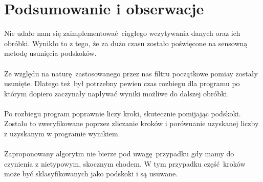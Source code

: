 \documentclass[a4paper, 12pt, titlepage]{article}
\begin{document}
    \section{Podsumowanie i obserwacje}
        Nie udało nam się zaimplementować ciągłego wczytywania danych
        oraz ich obróbki. Wynikło to z tego, że za dużo czasu zostało
        poświęcone na sensowną metodę usunięcia podskoków.
        \\ \\
        Ze względu na naturę zastosowanego przez nas filtru początkowe
        pomiay zostały usunięte. Dlatego też był potrzebny pewien
        czas rozbiegu dla programu po którym dopiero zaczynały napływać
        wyniki możliwe do dalszej obróbki.
        \\ \\
        Po rozbiegu program poprawnie liczy kroki, skutecznie pomijając
        podskoki. Zostało to zweryfikowane poprzez zliczanie kroków i
        porównanie uzyskanej liczby z uzyskanym w programie wynikiem.
        \\ \\
        Zaproponowany algorytm nie bierze pod uwagę przypadku gdy mamy
        do czynienia z nietypowym, skocznym chodem. W tym przypadku
        część kroków może być sklasyfikowanych jako podskoki i są
        usuwane.
\end{document}
